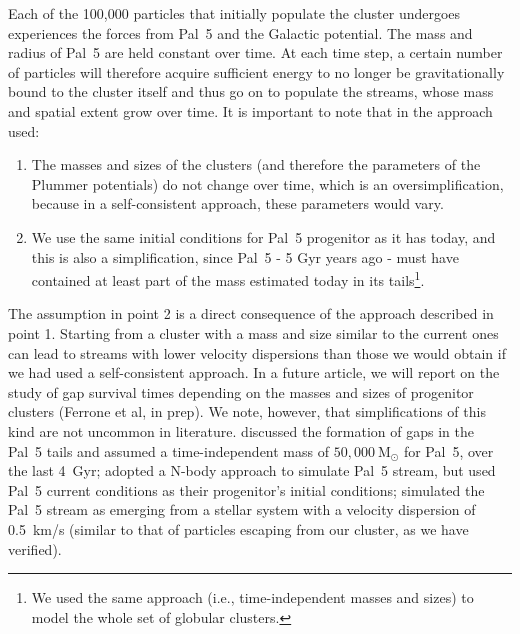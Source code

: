         Each of the 100,000 particles that initially populate the cluster undergoes experiences the forces from Pal~5 and the Galactic potential. The mass and radius of Pal~5 are held constant over time. At each time step, a certain number of particles will therefore acquire sufficient energy to no longer be gravitationally bound to the cluster itself and thus go on to populate the streams, whose mass and spatial extent grow over time. It is important to note that in the approach used:

        \begin{enumerate}
            \item The masses and sizes of the clusters (and therefore the parameters of the Plummer potentials) do not change over time, which is an oversimplification, because in a self-consistent approach, these parameters would vary. 
            \item We use the same initial conditions for Pal~5 progenitor as it has today, and this is also a simplification, since Pal~5 - 5 Gyr years ago - must have contained at least part of the mass estimated today in its tails\footnote{We used the same approach (i.e., time-independent masses and sizes) to model the whole set of globular clusters.}. 
        \end{enumerate}

        The assumption in point 2 is a direct consequence of the approach described in point 1. Starting from a cluster with a mass and size similar to the current ones can lead to streams with lower velocity dispersions than those we would obtain if we had used a self-consistent approach. In a future article, we will report on the study of gap survival times depending on the masses and sizes of progenitor clusters (Ferrone et al, in prep). We note, however, that simplifications of this kind are not uncommon in literature. \citet{2017NatAs...1..633P} discussed the formation of gaps in the Pal~5 tails and assumed a time-independent mass of $50,000 ~\textrm{M}_\odot$ for Pal~5, over the last 4~Gyr; \citet{2017MNRAS.470...60E} adopted a N-body approach to simulate Pal~5 stream, but used Pal~5 current conditions as their progenitor's initial conditions; \citet{2019MNRAS.484.2009B} simulated the Pal~5 stream as emerging from a stellar system with a velocity dispersion of 0.5~km/s (similar to that of particles escaping from our cluster, as we have verified). 

